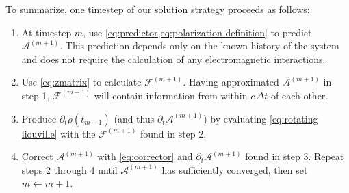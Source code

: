 To summarize, one timestep of our solution strategy proceeds as follows:
\begin{enumerate}
  \item At timestep $m$, use \cref{eq:predictor,eq:polarization definition} to predict $\mathcal{A}^{(m + 1)}$.
    This prediction depends only on the known history of the system and does not require the calculation of any electromagnetic interactions.
  \item Use \cref{eq:zmatrix} to calculate $\mathcal{F}^{(m + 1)}$.
    Having approximated $\mathcal{A}^{(m + 1)}$ in step 1, $\mathcal{F}^{(m + 1)}$ will contain information from \qds{} within $c \, \Delta t$ of each other.
  \item Produce $\partial_t \tilde{\rho}(t_{m + 1})$ (and thus $\partial_t \mathcal{A}^{(m + 1)}$) by evaluating \cref{eq:rotating liouville} with the $\mathcal{F}^{(m+1)}$ found in step 2.
  \item Correct $\mathcal{A}^{(m + 1)}$ with \cref{eq:corrector} and $\partial_t \mathcal{A}^{(m + 1)}$ found in step 3.
    Repeat steps 2 through 4 until $\mathcal{A}^{(m + 1)}$ has sufficiently converged, then set $m \leftarrow m + 1$.
\end{enumerate}
